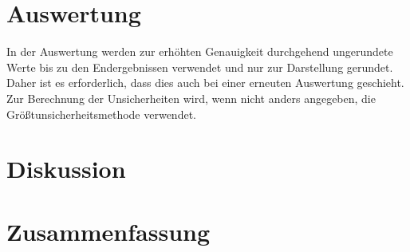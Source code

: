\documentclass[12pt,a4paper,twoside]{article}
\theoremstyle{definition}
\begin{document}
\section{Auswertung}

In der Auswertung werden zur erhöhten Genauigkeit durchgehend ungerundete Werte bis zu den Endergebnissen verwendet und nur zur Darstellung gerundet. Daher ist es erforderlich, dass dies auch bei einer erneuten Auswertung geschieht. \\
Zur Berechnung der Unsicherheiten wird, wenn nicht anders angegeben, die Größtunsicherheitsmethode verwendet.



\section{Diskussion}



\section{Zusammenfassung}



\printbibliography
{}
\end{document}
